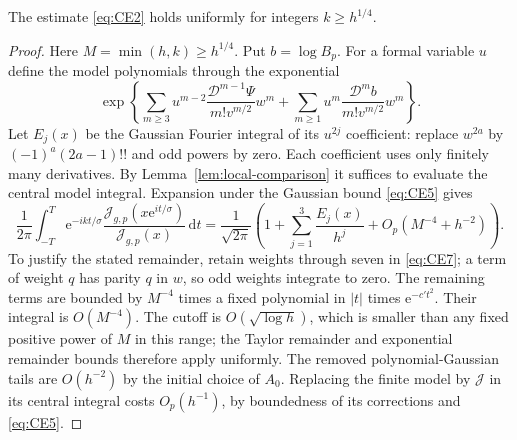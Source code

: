 \begin{lemma}\label{lem:large-indices}
The estimate \eqref{eq:CE2} holds uniformly for integers $k\ge h^{1/4}$.
\end{lemma}

\begin{proof}
Here $M=\min(h,k)\ge h^{1/4}$. Put $b=\log B_p$. For a formal
variable $u$ define the model polynomials through the exponential
\begin{equation}
 \exp\!\left\{
 \sum_{m\ge3}u^{m-2}\frac{\mathscr D^{m-1}\Psi}{m!v^{m/2}}w^m
 +\sum_{m\ge1}u^m\frac{\mathscr D^mb}{m!v^{m/2}}w^m\right\}.
 \label{eq:CE7}
\end{equation}
Let $E_j(x)$ be the Gaussian Fourier integral of its $u^{2j}$
coefficient: replace $w^{2a}$ by $(-1)^a(2a-1)!!$ and odd powers
by zero. Each coefficient uses only finitely many derivatives.
By Lemma~\ref{lem:local-comparison} it suffices to evaluate the central
model integral. Expansion under the Gaussian bound \eqref{eq:CE5} gives
\begin{equation}
 \frac1{2\pi}\int_{-T}^T \mathrm{e}^{-ikt/\sigma}
       \frac{\mathcal J_{g,p}(x\mathrm{e}^{it/\sigma})}{\mathcal J_{g,p}(x)}\,\mathrm{d}t
 =\frac1{\sqrt{2\pi}}\left(1+\sum_{j=1}^3\frac{E_j(x)}{h^j}
                                  +O_p(M^{-4}+h^{-2})\right).
 \label{eq:CE8}
\end{equation}
To justify the stated remainder, retain weights through seven in
\eqref{eq:CE7}; a term of weight $q$ has parity $q$ in $w$, so odd
weights integrate to zero. The remaining terms are bounded by $M^{-4}$ times
a fixed polynomial in $|t|$ times $\mathrm{e}^{-c't^2}$. Their integral is
$O(M^{-4})$. The cutoff is $O(\sqrt{\log h})$, which is smaller than
any fixed positive power of $M$ in this range; the Taylor remainder
and exponential remainder bounds therefore apply uniformly. The
removed polynomial-Gaussian tails are $O(h^{-2})$ by the initial
choice of $A_0$. Replacing the finite model by $\mathcal J$ in its central
integral costs $O_p(h^{-1})$, by boundedness of its corrections and
\eqref{eq:CE5}.


\end{proof}
